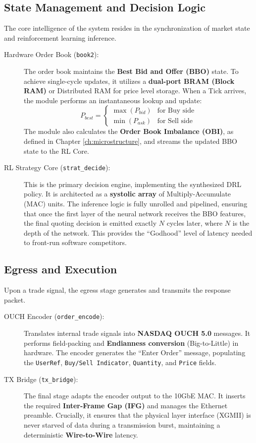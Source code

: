 \subsection{State Management and Decision Logic}
The core intelligence of the system resides in the synchronization of market state and reinforcement learning inference.

\begin{description}
    \item[Hardware Order Book (\texttt{book2}):] The order book maintains the \textbf{Best Bid and Offer (BBO)} state. To achieve single-cycle updates, it utilizes a \textbf{dual-port BRAM (Block RAM)} or Distributed RAM for price level storage. When a Tick arrives, the module performs an instantaneous lookup and update:
    \begin{equation}
        P_{best} = \begin{cases} \max(P_{bid}) & \text{for Buy side} \\ \min(P_{ask}) & \text{for Sell side} \end{cases}
    \end{equation}
    The module also calculates the \textbf{Order Book Imbalance (OBI)}, as defined in Chapter \ref{ch:microstructure}, and streams the updated BBO state to the RL Core.

    \item[RL Strategy Core (\texttt{strat\_decide}):] This is the primary decision engine, implementing the synthesized DRL policy. It is architected as a \textbf{systolic array} of Multiply-Accumulate (MAC) units. The inference logic is fully unrolled and pipelined, ensuring that once the first layer of the neural network receives the BBO features, the final quoting decision is emitted exactly $N$ cycles later, where $N$ is the depth of the network. This provides the ``Godhood'' level of latency needed to front-run software competitors.
\end{description}

\subsection{Egress and Execution}
Upon a trade signal, the egress stage generates and transmits the response packet.

\begin{description}
    \item[OUCH Encoder (\texttt{order\_encode}):] Translates internal trade signals into \textbf{NASDAQ OUCH 5.0} messages. It performs field-packing and \textbf{Endianness conversion} (Big-to-Little) in hardware. The encoder generates the ``Enter Order'' message, populating the \texttt{UserRef}, \texttt{Buy/Sell Indicator}, \texttt{Quantity}, and \texttt{Price} fields.

    \item[TX Bridge (\texttt{tx\_bridge}):] The final stage adapts the encoder output to the 10GbE MAC. It inserts the required \textbf{Inter-Frame Gap (IFG)} and manages the Ethernet preamble. Crucially, it ensures that the physical layer interface (XGMII) is never starved of data during a transmission burst, maintaining a deterministic \textbf{Wire-to-Wire} latency.
\end{description}

